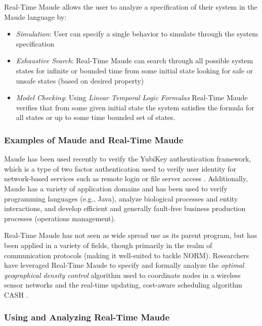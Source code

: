 \documentclass[10pt, journal]{IEEEtran}
\begin{document}
Real-Time Maude allows the user to analyze a specification of their system in the Maude language by:
\begin{itemize}
	\item \textit{Simulation}: User can specify a single behavior to simulate through the system specification
	\item \textit{Exhaustive Search}: Real-Time Maude can search through all possible system states for infinite or bounded time from some initial state looking for safe or unsafe states (based on desired property)
	\item \textit{Model Checking}: Using \textit{Linear Temporal Logic Formulas} Real-Time Maude verifies that from some given initial state the system satisfies the formula for all states or up to some time bounded set of states.
\end{itemize}

\subsubsection{Examples of Maude and Real-Time Maude}

Maude has been used recently to verify the YubiKey authentication framework, which is a type of two factor authentication used to verify user identity for network-based services such as remote login or file server access \cite{Escobar2018}. Additionally, Maude has a variety of application domains and has been used to verify programming languages (e.g., Java), analyze biological processes and entity interactions, and develop efficient and generally fault-free business production processes (operations management). 

Real-Time Maude has not seen as wide spread use as its parent program, but has been applied in a variety of fields, though primarily in the realm of communication protocols (making it well-suited to tackle NORM). Researchers have leveraged Real-Time Maude to specify and formally analyze the \textit{optimal geographical density control} algorithm used to coordinate nodes in a wireless sensor networks and the real-time updating, cost-aware scheduling algorithm CASH  \cite{Thorvaldsen2007, Caccamo2006}.

\subsubsection{Using and Analyzing Real-Time Maude}
\end{document}

